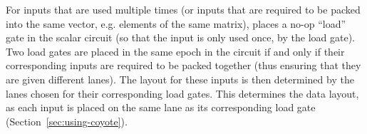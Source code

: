 For inputs that are used multiple times (or inputs that are required to be packed into the same vector, e.g. elements of the same matrix), {\system} places a no-op ``load'' gate in the scalar circuit (so that the input is only used once, by the load gate).
Two load gates are placed in the same epoch in the circuit if and only if their corresponding inputs are required to be packed together (thus ensuring that they are given different lanes).
The layout for these inputs is then determined by the lanes chosen for their corresponding load gates.
This determines the data layout, as each input is placed on the same lane as its corresponding load gate (Section~{\ref{sec:using-coyote}}). %
